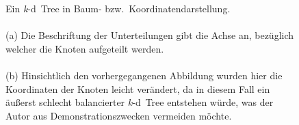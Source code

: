 \documentclass[%
			paper=a4,%
			DIV12,
			liststotoc,
			bibtotoc,
			draft=false,%
			titlepage,
			numbers=noendperiod
			]{scrartcl}
\newcommand{\kd}{\mbox{\textit{k}-d}}
\newcommand{\myfig}[5] {
 \begin{figure}[tbph]
	 \centering
	 \texttt{[image: \#1]}
	 \caption[#4]{#5}
	 \label{fig:#2}
 \end{figure}
}
\begin{document}
\begin{figure}[h]
	\centering
	\hspace{2em}

	\caption[\kd\ Tree]{Ein \kd\ Tree in Baum- bzw.\ Koordinatendarstellung.
	\\ \\
	(a) Die Beschriftung der Unterteilungen gibt die Achse an, bezüglich welcher die Knoten aufgeteilt werden.
	\\ \\
	(b) Hinsichtlich den vorhergegangenen Abbildung wurden hier die Koordinaten der Knoten leicht verändert, da in diesem Fall ein äußerst schlecht balancierter \kd\ Tree entstehen würde, was der Autor aus Demonstrationszwecken vermeiden möchte.}
\end{figure}

\end{document}
